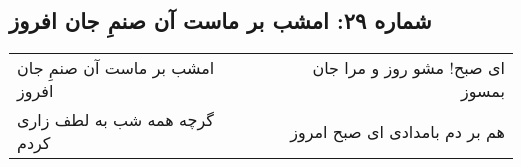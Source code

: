 \begin{center}
\section*{شماره ۲۹: امشب بر ماست آن صنمِ جان افروز}
\label{sec:029}
\begin{longtable}{l p{0.5cm} r}
امشب بر ماست آن صنمِ جان افروز
&&
ای صبح! مشو روز و مرا جان بمسوز
\\
گرچه همه شب به لطف زاری کردم
&&
هم بر دم بامدادی ای صبح امروز
\\
\end{longtable}
\end{center}
